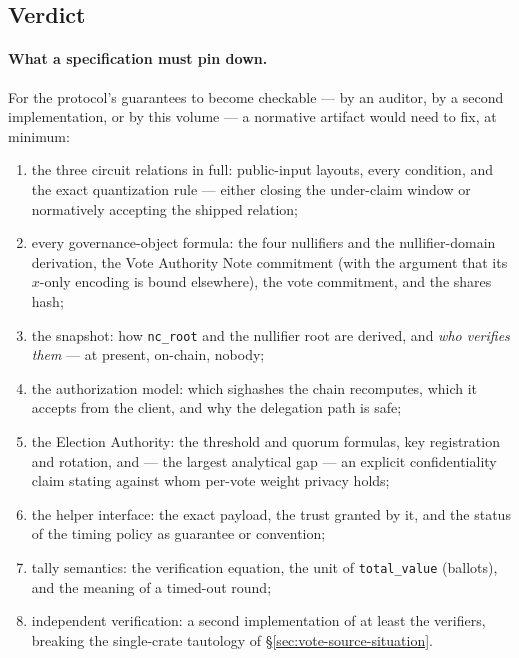 \documentclass[11pt,a4paper]{article}
\theoremstyle{definition}
\begin{document}
\subsection{Verdict}\label{sec:vote-verdict}

\paragraph{What a specification must pin down.} For the protocol's
guarantees to become checkable --- by an auditor, by a second
implementation, or by this volume --- a normative artifact would need to
fix, at minimum:
\begin{enumerate}[itemsep=1pt]
\item the three circuit relations in full: public-input layouts, every
  condition, and the exact quantization rule --- either closing the
  under-claim window or normatively accepting the shipped relation;
\item every governance-object formula: the four nullifiers and the
  nullifier-domain derivation, the Vote Authority Note commitment
  (with the argument that its $x$-only encoding is bound elsewhere), the
  vote commitment, and the shares hash;
\item the snapshot: how \texttt{nc\_root} and the nullifier root are
  derived, and \emph{who verifies them} --- at present, on-chain, nobody;
\item the authorization model: which sighashes the chain recomputes,
  which it accepts from the client, and why the delegation path is safe;
\item the Election Authority: the threshold and quorum formulas, key
  registration and rotation, and --- the largest analytical gap --- an
  explicit confidentiality claim stating against whom per-vote weight
  privacy holds;
\item the helper interface: the exact payload, the trust granted by it,
  and the status of the timing policy as guarantee or convention;
\item tally semantics: the verification equation, the unit of
  \texttt{total\_value} (ballots), and the meaning of a timed-out round;
\item independent verification: a second implementation of at least the
  verifiers, breaking the single-crate tautology of
  \S\ref{sec:vote-source-situation}.
\end{enumerate}
\end{document}
